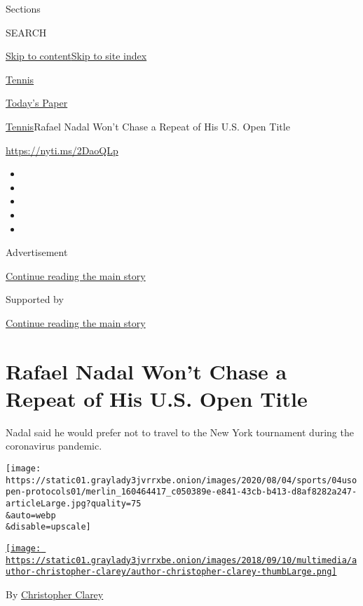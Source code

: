 Sections

SEARCH

\protect\hyperlink{site-content}{Skip to
content}\protect\hyperlink{site-index}{Skip to site index}

\href{https://www.nytimes3xbfgragh.onion/section/sports/tennis}{Tennis}

\href{https://myaccount.nytimes3xbfgragh.onion/auth/login?response_type=cookie\&client_id=vi}{}

\href{https://www.nytimes3xbfgragh.onion/section/todayspaper}{Today's
Paper}

\href{/section/sports/tennis}{Tennis}\textbar{}Rafael Nadal Won't Chase
a Repeat of His U.S. Open Title

\url{https://nyti.ms/2DaoQLp}

\begin{itemize}
\item
\item
\item
\item
\item
\end{itemize}

Advertisement

\protect\hyperlink{after-top}{Continue reading the main story}

Supported by

\protect\hyperlink{after-sponsor}{Continue reading the main story}

\hypertarget{rafael-nadal-wont-chase-a-repeat-of-his-us-open-title}{%
\section{Rafael Nadal Won't Chase a Repeat of His U.S. Open
Title}\label{rafael-nadal-wont-chase-a-repeat-of-his-us-open-title}}

Nadal said he would prefer not to travel to the New York tournament
during the coronavirus pandemic.

\texttt{[image: https://static01.graylady3jvrrxbe.onion/images/2020/08/04/sports/04usopen-protocols01/merlin\_160464417\_c050389e-e841-43cb-b413-d8af8282a247-articleLarge.jpg?quality=75\\\&auto=webp\\\&disable=upscale]}

\href{https://www.nytimes3xbfgragh.onion/by/christopher-clarey}{\texttt{[image: https://static01.graylady3jvrrxbe.onion/images/2018/09/10/multimedia/author-christopher-clarey/author-christopher-clarey-thumbLarge.png]}}

By
\href{https://www.nytimes3xbfgragh.onion/by/christopher-clarey}{Christopher
Clarey}

